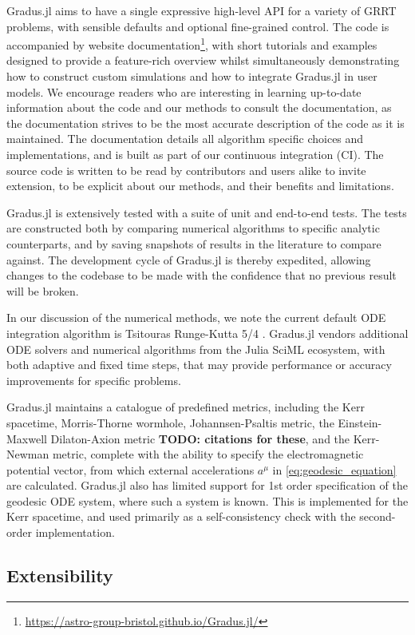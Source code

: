 \documentclass[fleqn,usenatbib]{mnras}
\newcommand{\todo}[1]{{\noindent \bf \color{red} TODO: #1}}
\newcommand{\Gradus}{Gradus.jl }
\begin{document}
\Gradus aims to have a single expressive high-level API for a variety of GRRT problems, with sensible defaults and optional fine-grained control. The code is accompanied by website documentation\footnote{\url{https://astro-group-bristol.github.io/Gradus.jl/}}, with short tutorials and examples designed to provide a feature-rich overview whilst simultaneously demonstrating how to construct custom simulations and how to integrate \Gradus in user models. We encourage readers who are interesting in learning up-to-date information about the code and our methods to consult the documentation, as the documentation strives to be the most accurate description of the code as it is maintained. The documentation details all algorithm specific choices and implementations, and is built as part of our continuous integration (CI). The source code is written to be read by contributors and users alike to invite extension, to be explicit about our methods, and their benefits and limitations.

\Gradus is extensively tested with a suite of unit and end-to-end tests. The tests are constructed both by comparing numerical algorithms to specific analytic counterparts, and by saving snapshots of results in the literature to compare against. The development cycle of \Gradus is thereby expedited, allowing changes to the codebase to be made with the confidence that no previous result will be broken.

In our discussion of the numerical methods, we note the current default ODE integration algorithm is Tsitouras Runge-Kutta 5/4 \citep{tsitouras_rungekutta_2011}. \Gradus vendors additional ODE solvers and numerical algorithms from the Julia SciML ecosystem, with both adaptive and fixed time steps, that may provide performance or accuracy improvements for specific problems.

\Gradus maintains a catalogue of predefined metrics, including the Kerr spacetime, Morris-Thorne wormhole, Johannsen-Psaltis metric, the Einstein-Maxwell Dilaton-Axion metric \todo{citations for these}, and the Kerr-Newman metric, complete with the ability to specify the electromagnetic potential vector, from which external accelerations $a^\mu$ in \eqref{eq:geodesic_equation} are calculated. \Gradus also has limited support for 1st order specification of the geodesic ODE system, where such a system is known. This is implemented for the Kerr spacetime, and used primarily as a self-consistency check with the second-order implementation.

\subsection{Extensibility}
\end{document}
